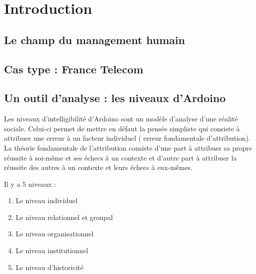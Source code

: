 \documentclass[12pt]{article}
\begin{document}
\section{Introduction}
  \subsection{Le champ du management humain}
  \subsection{Cas type : France Telecom}
  \subsection{Un outil d'analyse : les niveaux d'Ardoino}
  Les niveaux d'intelligibilité d'Ardoino sont un modèle d'analyse d'une réalité sociale. Celui-ci permet de mettre en défaut la pensée simpliste qui consiste à attribuer une erreur à un facteur individuel (\og{} erreur fondamentale d'attribution\fg{}). La théorie fondamentale de l'attribution consiste d'une part à attribuer sa propre réussite à soi-même et ses échecs à un contexte et d'autre part à attribuer la réussite des autres à un contexte et leurs échecs à eux-mêmes.
  
  Il y a 5 niveaux :
  
  \begin{enumerate}
   \item Le niveau individuel
   \item Le niveau relationnel et groupal
   \item Le niveau organisationnel
   \item Le niveau institutionnel
   \item Le niveau d'historicité
  \end{enumerate}
  
  
\end{document}
